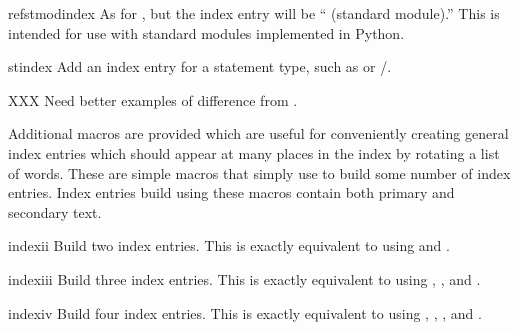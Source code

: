 \documentclass{howto}
\begin{document}
    \begin{macrodesc}{refstmodindex}{}
      As for , but the index entry will be
      `` (standard module).''  This is intended for use
      with standard modules implemented in Python.
    \end{macrodesc}

    \begin{macrodesc}{stindex}{}
      Add an index entry for a statement type, such as 
      or /.

      XXX Need better examples of difference from .
    \end{macrodesc}


    Additional macros are provided which are useful for conveniently
    creating general index entries which should appear at many places
    in the index by rotating a list of words.  These are simple macros
    that simply use  to build some number of index
    entries.  Index entries build using these macros contain both
    primary and secondary text.

    \begin{macrodesc}{indexii}{}
      Build two index entries.  This is exactly equivalent to using
       and
      .
    \end{macrodesc}

    \begin{macrodesc}{indexiii}{}
      Build three index entries.  This is exactly equivalent to using
      ,
      , and
      .
    \end{macrodesc}

    \begin{macrodesc}{indexiv}{}
      Build four index entries.  This is exactly equivalent to using
      ,
      ,
      ,
      and
      .
    \end{macrodesc}
\end{document}
